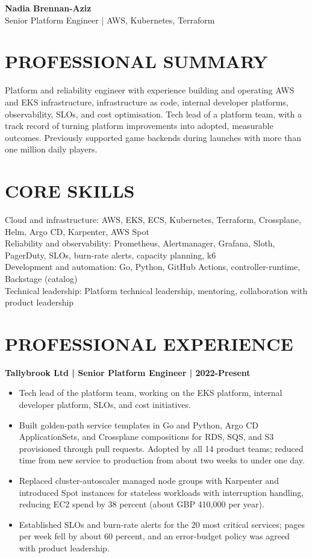 \documentclass[11pt,a4paper]{article}
\begin{document}
\begin{center}
{\Huge\bfseries\color{primarycolor} Nadia Brennan-Aziz}\\[0.35em]
{\large\color{accentcolor} Senior Platform Engineer | AWS, Kubernetes, Terraform}
\end{center}

\section*{PROFESSIONAL SUMMARY}
Platform and reliability engineer with experience building and operating AWS and EKS infrastructure, infrastructure as code, internal developer platforms, observability, SLOs, and cost optimisation. Tech lead of a platform team, with a track record of turning platform improvements into adopted, measurable outcomes. Previously supported game backends during launches with more than one million daily players.

\section*{CORE SKILLS}
Cloud and infrastructure: AWS, EKS, ECS, Kubernetes, Terraform, Crossplane, Helm, Argo CD, Karpenter, AWS Spot\\
Reliability and observability: Prometheus, Alertmanager, Grafana, Sloth, PagerDuty, SLOs, burn-rate alerts, capacity planning, k6\\
Development and automation: Go, Python, GitHub Actions, controller-runtime, Backstage (catalog)\\
Technical leadership: Platform technical leadership, mentoring, collaboration with product leadership

\section*{PROFESSIONAL EXPERIENCE}
\textbf{Tallybrook Ltd | Senior Platform Engineer | 2022-Present}
\begin{itemize}
\item Tech lead of the platform team, working on the EKS platform, internal developer platform, SLOs, and cost initiatives.
\item Built golden-path service templates in Go and Python, Argo CD ApplicationSets, and Crossplane compositions for RDS, SQS, and S3 provisioned through pull requests. Adopted by all 14 product teams; reduced time from new service to production from about two weeks to under one day.
\item Replaced cluster-autoscaler managed node groups with Karpenter and introduced Spot instances for stateless workloads with interruption handling, reducing EC2 spend by 38 percent (about GBP 410,000 per year).
\item Established SLOs and burn-rate alerts for the 20 most critical services; pages per week fell by about 60 percent, and an error-budget policy was agreed with product leadership.
\end{itemize}
\end{document}
